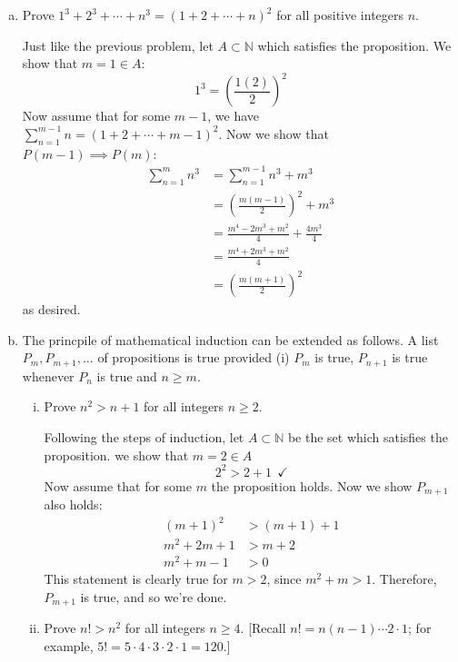 \documentclass[10pt]{article}
\begin{document}
    \begin{enumerate}[(a)]
        \item Prove $1^3 + 2^3 + \cdots + n^3 = (1+2 + \cdots + n)^2$ for all positive integers $n$.

        \begin{solution}
            Just like the previous problem, let $A \subset \mathbb N$ which satisfies the proposition. We show that $m = 1 \in A$:
            \[ 1^3 = \left(\frac{1(2)}{2}\right)^2\] 
            Now assume that for some $m-1$, we have $\sum_{n = 1}^{m-1} n = (1 + 2 + \cdots + m-1)^2$. Now we show that $P(m-1) \implies P(m)$: 
            \begin{align*}
                \sum_{n = 1}^{m} n^3 &= \sum_{n = 1}^{m-1} n^3 + m^3\\
                &= \left( \frac{m(m-1)}{2}\right)^2 + m^3\\
                &= \frac{m^4 - 2m^3 + m^2}{4} + \frac{4m^3}{4}\\
                &= \frac{m^4 + 2m^3 + m^2}{4}\\
                &= \left(\frac{m(m+1)}{2}\right)^2
            \end{align*}
            as desired.
        \end{solution}
        \item The princpile of mathematical induction can be extended as follows. A list $P_m, P_{m+1}, \dots$ of propositions is true provided (i) $P_m$ is true, $P_{n+1}$ is true whenever $P_n$ is true and $n \ge m$.
        \begin{enumerate}[(i)]
            \item Prove $n^2 > n+1$ for all integers $n \ge 2$. 
            
            \begin{solution}
                Following the steps of induction, let $A \subset \mathbb N$ be the set which satisfies the proposition. we show that $m = 2 \in A$
                \[ 2^2 > 2+1 \ \ \checkmark\] 
                Now assume that for some $m$ the proposition holds. Now we show $P_{m+1}$ also holds: 
                \begin{align*}
                    (m+1)^2 &> (m+1)+1\\
                    m^2 + 2m + 1 &> m+2\\
                    m^2 + m - 1 &> 0
                \end{align*} 
                This statement is clearly true for $m > 2$, since $m^2 +m > 1$. Therefore, $P_{m+1}$ is true, and so we're done.
            \end{solution}
            \item Prove $n! > n^2$ for all integers $n \ge 4$. [Recall $n! = n(n-1) \cdots 2 \cdot 1$; for example, $5! = 5 \cdot 4 \cdot 3 \cdot 2 \cdot 1 = 120$.]
            

\end{enumerate}
\end{enumerate}
\end{document}
